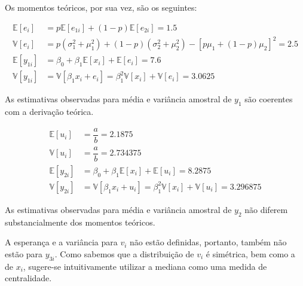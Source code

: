 \documentclass{homework}\usepackage[]{graphicx}\usepackage[]{color}
\begin{document}
Os momentos teóricos, por sua vez, são os seguintes:

\begin{align}
  \mathbb{E}\left[e_i\right] &= p\mathbb{E}\left[e_{1i}\right] + (1-p)\mathbb{E}\left[e_{2i}\right] = 1.5\\
  \mathbb{V}\left[e_i\right] &= p(\sigma^2_1 + \mu_1^2) + (1-p)(\sigma^2_2 + \mu_2^2) - [p\mu_1 + (1-p)\mu_2]^2 = 2.5\\
  \mathbb{E}\left[y_{1i}\right] &= \beta_0 + \beta_1 \mathbb{E}\left[x_i\right] + \mathbb{E}\left[e_i\right] = 7.6\\
  \mathbb{V}\left[y_{1i}\right] &= \mathbb{V}\left[\beta_1x_i + e_i\right] = \beta_1^2\mathbb{V}\left[x_{i}\right] + \mathbb{V}\left[e_{i}\right] = 3.0625
\end{align}

As estimativas observadas para média e variância amostral de $y_{1}$ são coerentes com a derivação teórica.

\begin{align}
  \mathbb{E}\left[u_i\right] &= \dfrac{a}{b} = 2.1875\\
  \mathbb{V}\left[u_i\right] &= \dfrac{a}{b} = 2.734375\\
  \mathbb{E}\left[y_{2i}\right] &= \beta_0 + \beta_1 \mathbb{E}\left[x_i\right] + \mathbb{E}\left[u_i\right] = 8.2875\\
  \mathbb{V}\left[y_{2i}\right] &= \mathbb{V}\left[\beta_1x_i + u_i\right] = \beta_1^2\mathbb{V}\left[x_{i}\right] + \mathbb{V}\left[u_{i}\right] = 3.296875
\end{align}

As estimativas observadas para média e variância amostral de $y_{2}$ não diferem substancialmente dos momentos teóricos.

A esperança e a variância para $v_i$ não estão definidas, portanto, também não estão para $y_{3i}$. Como sabemos que a distribuição de $v_i$ é simétrica, bem como a de $x_i$, sugere-se intuitivamente utilizar a mediana como uma medida de centralidade.

\question
\end{document}

